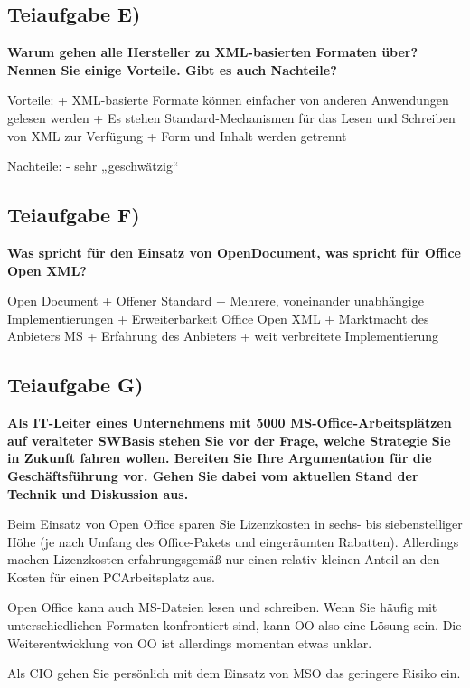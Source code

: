 

\subsection{Teiaufgabe E)}
\textbf{Warum gehen alle Hersteller zu XML-basierten Formaten über? Nennen Sie einige
Vorteile. Gibt es auch Nachteile?}

Vorteile:
+ XML-basierte Formate können einfacher von anderen Anwendungen gelesen werden
+ Es stehen Standard-Mechanismen für das Lesen und Schreiben von XML zur Verfügung
+ Form und Inhalt werden getrennt

Nachteile:
- sehr „geschwätzig“

\subsection{Teiaufgabe F)}
\textbf{Was spricht für den Einsatz von OpenDocument, was spricht für Office Open XML?}

Open Document
+ Offener Standard
+ Mehrere, voneinander unabhängige Implementierungen
+ Erweiterbarkeit
Office Open XML
+ Marktmacht des Anbieters MS
+ Erfahrung des Anbieters
+ weit verbreitete Implementierung

\subsection{Teiaufgabe G)}
\textbf{Als IT-Leiter eines Unternehmens mit 5000 MS-Office-Arbeitsplätzen auf veralteter SWBasis
stehen Sie vor der Frage, welche Strategie Sie in Zukunft fahren wollen. Bereiten
Sie Ihre Argumentation für die Geschäftsführung vor. Gehen Sie dabei vom aktuellen
Stand der Technik und Diskussion aus.}


Beim Einsatz von Open Office sparen Sie Lizenzkosten in sechs- bis siebenstelliger Höhe
(je nach Umfang des Office-Pakets und eingeräumten Rabatten). Allerdings machen
Lizenzkosten erfahrungsgemäß nur einen relativ kleinen Anteil an den Kosten für einen PCArbeitsplatz
aus.

Open Office kann auch MS-Dateien lesen und schreiben. Wenn Sie häufig mit
unterschiedlichen Formaten konfrontiert sind, kann OO also eine Lösung sein.
Die Weiterentwicklung von OO ist allerdings momentan etwas unklar.

Als CIO gehen Sie persönlich mit dem Einsatz von MSO das geringere Risiko ein.


\clearpage 
